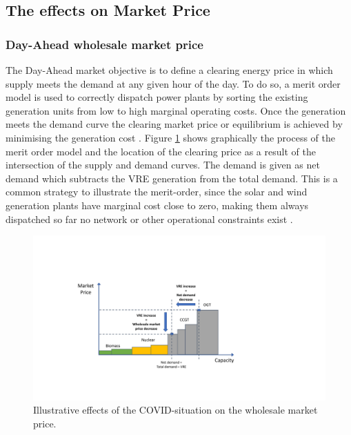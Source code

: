 \documentclass[energies,article,submit,moreauthors,pdftex]{Definitions/mdpi}
\begin{document}

\subsection{The effects on Market Price}\label{section:Market price}

\subsubsection{Day-Ahead wholesale market price}\label{sec:day-ahead wholesale market price}

The Day-Ahead market objective is to define a clearing energy price in which supply meets the demand at any given hour of the day. To do so, a merit order model is used to correctly dispatch power plants by sorting the existing generation units from low to high marginal operating costs. Once the generation meets the demand curve the clearing market price or equilibrium is achieved by minimising the generation cost \cite{Maekawa2018TheExchange}. Figure \ref{fig:wholesale-market-effects} shows graphically the process of the merit order model and the location of the clearing price as a result of the intersection of the supply and demand curves. The demand is given as net demand which subtracts the VRE generation from the total demand. This is a common strategy to illustrate the merit-order, since the solar and wind generation plants have marginal cost close to zero, making them always dispatched so far no network or other operational constraints exist \cite{Hirth2014TheVariability}. 

\begin{figure}[H]
\centering
\hspace{-25pt}
\includegraphics[trim={4cm 3cm 3.5cm 4.5cm},clip,width=1.3\textwidth]{Graphics/Wholesale-market-price.pdf}
\caption{Illustrative effects of the COVID-situation on the wholesale market price.}
\label{fig:wholesale-market-effects}
\end{figure} 
\end{document}
